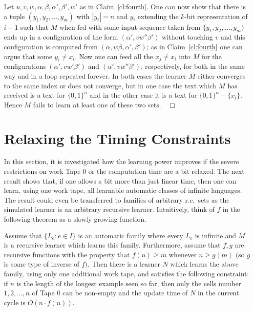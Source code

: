 \documentclass{LMCS}
\theoremstyle{plain}\newtheorem{athm}[thm]{Theorem}
\theoremstyle{plain}\newtheorem{aprop}[thm]{Proposition}
\theoremstyle{plain}\newtheorem{aprob}[thm]{Open Problem}
\theoremstyle{plain}\newtheorem{acor}[thm]{Corollary}
\theoremstyle{plain}\newtheorem{alem}[thm]{Lemma}
\theoremstyle{definition}\newtheorem{adefn}[thm]{Definition}
\theoremstyle{definition}\newtheorem{arem}[thm]{Remark}
\theoremstyle{plain}\newtheorem{aexmp}[thm]{Example}
\theoremstyle{plain}\newtheorem{aclm}[thm]{Claim}
\def\niceqed{~~$\Box$}
\begin{document}
\noindent
Let $u,v,w,\alpha,\beta,\alpha',\beta',w'$ as in
Claim~\ref{cl:fourth}. One can now
show that there is a tuple $(y_1,y_2,\ldots,y_m)$ with
$|y_i| = n$ and $y_i$ extending the $k$-bit representation of $i-1$
such that $M$ when fed with some input-sequence taken from
$\{y_1,y_2,\ldots,y_m\}$ ends up in a
configuration of the form $(\alpha',vw''\beta')$ without touching $v$ and
this configuration is computed from $(\alpha,w\beta,\alpha',\beta')$; as in
Claim~\ref{cl:fourth} one can argue that some $y_i \neq x_i$.
Now one can feed all the $x_j \neq x_i$ into $M$ for the
configurations $(\alpha',vw'\beta')$ and $(\alpha',vw''\beta')$, respectively,
for both in the same way and in a loop repeated forever.
In both cases the learner $M$
either converges to the same index or does not converge,
but in one case the text which $M$ has received is a text for $\{0,1\}^n$
and in the other case it is a text for $\{0,1\}^n-\{x_i\}$.
Hence $M$ fails to learn at least one of these two sets.\niceqed

\section{Relaxing the Timing Constraints}

\noindent
In this section, it is investigated how the learning power improves
if the severe restrictions on work Tape $0$ or the computation
time are a bit relaxed.
The next result shows that, if one allows a bit more than just linear time,
then one can learn, using one work tape, all learnable
automatic classes of infinite languages. 
The result could even be transferred to families of arbitrary
r.e.\ sets as the simulated learner is an arbitrary recursive learner.
Intuitively, think of $f$ in the following theorem as a slowly growing
function.

\begin{thm} \label{th:onetapesuperlinear}
Assume that $\{L_e: e \in I\}$ is an automatic family where every $L_e$
is infinite and $M$ is a recursive learner which learns this family.
Furthermore, assume that $f,g$ are recursive functions with the property
that $f(n) \geq m$ whenever $n \geq g(m)$ $($so $g$ is some type of inverse
of $f)$. Then there is a learner $N$ which learns the above family,
using only one additional work tape,
and satisfies the following constraint: 
if $n$ is the length of the longest example seen so
far, then only the cells number $1,2,\ldots,n$ of Tape $0$ can be non-empty and
the update time of $N$ in the current cycle is $O(n \cdot f(n))$.
\end{thm}
\end{document}
